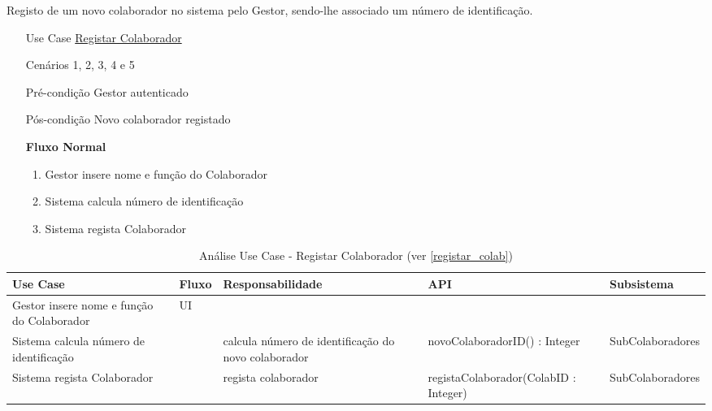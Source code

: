 \documentclass[../relatorio.tex]{subfiles}
\begin{document}
Registo de um novo colaborador no sistema pelo Gestor, sendo-lhe associado um número de identificação.
\begin{itemize}
    \item[Use Case] {\underline{Registar Colaborador}}
    \item[Cenários] {1, 2, 3, 4 e 5} 
    \item[Pré-condição] {Gestor autenticado}
    \item[Pós-condição] {Novo colaborador registado}
            \begin{flushleft}
                \textbf{Fluxo Normal}
            \end{flushleft}
            \begin{enumerate}
                \item Gestor insere nome e função do Colaborador
                \item Sistema calcula número de identificação
                \item Sistema regista Colaborador
            \end{enumerate}
\end{itemize}
\begin{landscape}
    \begin{table}[!h]
        \centering
        \begin{tabular}{|p{5cm}|p{1cm}|p{4cm}|p{6cm}|p{3cm}|}
            \hline
            \rowcolor{gray!20!white}
            Use Case & Fluxo                                            & Responsabilidade & API & Subsistema \\
            \hline
            \rowcolor{yellow}
            Gestor insere nome e função do Colaborador
                     & UI
                     & 
                     & 
                     & 
            \\
            \hline
            Sistema calcula número de identificação
                     & 
                     & calcula número de identificação do novo colaborador
                     & novoColaboradorID() : Integer
                     & SubColaboradores
            \\
            \hline
            Sistema regista Colaborador
                     & 
                     & regista colaborador
                     & registaColaborador(ColabID : Integer)
                     & SubColaboradores
            \\
            \hline
        \end{tabular}
        \caption{Análise Use Case - Registar Colaborador (ver \ref{registar_colab})}
    \end{table}
\end{landscape}
\end{document}
